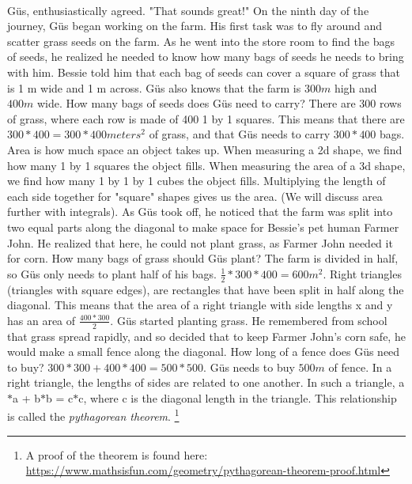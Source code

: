  \paragraph{} Güs, enthusiastically agreed. "That sounds great!"
{On the ninth day of the journey, Güs began working on the farm. His first task was to fly around and scatter grass seeds on the farm. As he went into the store room to find the bags of seeds, he realized he needed to know how many bags of seeds he needs to bring with him. Bessie told him that each bag of seeds can cover a square of grass that is 1 m wide and 1 m across. Güs also knows that the farm is $300 m$ high and $400 m$ wide. How many bags of seeds does Güs need to carry?}
{There are 300 rows of grass, where each row is made of 400 1 by 1 squares. This means that there are $300\ast 400 = 300\ast 400 meters^{2}$ of grass, and that Güs needs to carry $300\ast 400$ bags.}
{Area is how much space an object takes up. When measuring a 2d shape, we find how many 1 by 1 squares the object fills. When measuring the area of a 3d shape, we find how many 1 by 1 by 1 cubes the object fills. Multiplying the length of each side together for "square" shapes gives us the area. (We will discuss area further with integrals).}
{}
{As Güs took off, he noticed that the farm was split into two equal parts along the diagonal to make space for Bessie's pet human Farmer John. He realized that here, he could not plant grass, as Farmer John needed it for corn. How many bags of grass should Güs plant?}
{The farm is divided in half, so Güs only needs to plant half of his bags. $\frac{1}{2}\ast 300\ast 400 =600 m^{2}$.}
{Right triangles (triangles with square edges), are rectangles that have been split in half along the diagonal. This means that the area of a right triangle with side lengths x and y has an area of $\frac{400*300}{2}$.}
{}
{Güs started planting grass. He remembered from school that grass spread rapidly, and so decided that to keep Farmer John's corn safe, he would make a small fence along the diagonal. How long of a fence does Güs need to buy?}
{$300\ast 300 + 400\ast 400 = 500\ast 500$. Güs needs to buy $500 m$ of fence.}
{In a right triangle, the lengths of sides are related to one another. In such a triangle, a$\ast$a + b$\ast$b = c$\ast$c, where c is the diagonal length in the triangle. This relationship is called the \textit{pythagorean theorem}. \footnote{A proof of the theorem is found here: \url{https://www.mathsisfun.com/geometry/pythagorean-theorem-proof.html}}}

